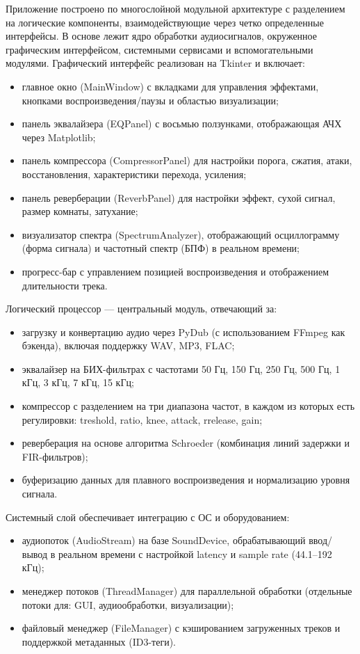 Приложение построено по многослойной модульной архитектуре с разделением на логические компоненты, взаимодействующие через четко определенные интерфейсы. В основе лежит ядро обработки аудиосигналов, окруженное графическим интерфейсом, системными сервисами и вспомогательными модулями.
Графический интерфейс реализован на Tkinter и включает:
\begin{itemize}
	\item главное окно (MainWindow) с вкладками для управления эффектами, кнопками воспроизведения/паузы и областью визуализации;
	\item панель эквалайзера (EQPanel) с восьмью ползунками, отображающая АЧХ через Matplotlib;
	\item панель компрессора (CompressorPanel) для настройки порога, сжатия, атаки, восстановления, характеристики перехода, усиления;
	\item панель реверберации (ReverbPanel) для настройки эффект, сухой сигнал, размер комнаты, затухание;
	\item визуализатор спектра (SpectrumAnalyzer), отображающий осциллограмму (форма сигнала) и частотный спектр (БПФ) в реальном времени;
	\item прогресс-бар с управлением позицией воспроизведения и отображением длительности трека.	
\end{itemize}

Логический процессор — центральный модуль, отвечающий за:
\begin{itemize}
	\item загрузку и конвертацию аудио через PyDub (с использованием FFmpeg как бэкенда), включая поддержку WAV, MP3, FLAC;
	\item эквалайзер на БИХ-фильтрах с частотами 50 Гц, 150 Гц, 250 Гц, 500 Гц, 1 кГц, 3 кГц, 7 кГц, 15 кГц;
	\item компрессор с разделением на три диапазона частот, в каждом из которых есть регулировки: treshold, ratio, knee, attack, rrelease, gain;
	\item реверберация на основе алгоритма Schroeder (комбинация линий задержки и FIR-фильтров);
	\item буферизацию данных для плавного воспроизведения и нормализацию уровня сигнала.
\end{itemize}

Системный слой обеспечивает интеграцию с ОС и оборудованием:
\begin{itemize}
	\item аудиопоток (AudioStream) на базе SoundDevice, обрабатывающий ввод/вывод в реальном времени с настройкой latency и sample rate (44.1–192 кГц);
	\item менеджер потоков (ThreadManager) для параллельной обработки (отдельные потоки для: GUI, аудиообработки, визуализации);
	\item файловый менеджер (FileManager) с кэшированием загруженных треков и поддержкой метаданных (ID3-теги).
\end{itemize}

